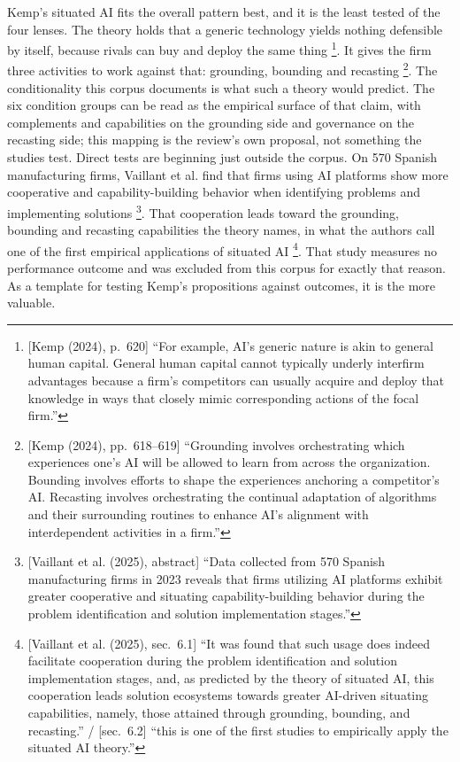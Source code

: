 Kemp's situated AI fits the overall pattern best, and it is the least tested of the
four lenses. The theory holds that a generic technology yields nothing defensible by
itself, because rivals can buy and deploy the same
thing \parencite[p.~620]{kemp2024competitive}\footnote{[Kemp (2024), p.~620] ``For
example, AI's generic nature is akin to general human capital. General human capital
cannot typically underly interfirm advantages because a firm's competitors can usually
acquire and deploy that knowledge in ways that closely mimic corresponding actions of
the focal firm.''}. It gives the firm three activities to work against that:
grounding, bounding and
recasting \parencite[pp.~618--619]{kemp2024competitive}\footnote{[Kemp (2024),
pp.~618--619] ``Grounding involves orchestrating which experiences one's AI will be
allowed to learn from across the organization. Bounding involves efforts to shape the
experiences anchoring a competitor's AI. Recasting involves orchestrating the continual
adaptation of algorithms and their surrounding routines to enhance AI's alignment with
interdependent activities in a firm.''}. The conditionality this corpus documents is
what such a theory would predict. The six condition groups can be read as the
empirical surface of that claim, with complements and capabilities on the grounding
side and governance on the recasting side; this mapping is the review's own proposal,
not something the studies test. Direct tests are beginning just outside the corpus.
On 570 Spanish manufacturing firms, Vaillant et al. find that firms using AI platforms
show more cooperative and capability-building behavior when identifying problems and
implementing solutions \parencite[abstract]{vaillant2025platforms}\footnote{[Vaillant et al. (2025),
abstract] ``Data collected from 570 Spanish manufacturing firms in 2023 reveals that
firms utilizing AI platforms exhibit greater cooperative and situating
capability-building behavior during the problem identification and solution
implementation stages.''}. That cooperation leads toward the grounding, bounding and
recasting capabilities the theory names, in what the authors call one of the first
empirical applications of situated
AI \parencite[secs.~6.1, 6.2]{vaillant2025platforms}\footnote{[Vaillant et al. (2025),
sec.~6.1] ``It was found that such usage does indeed facilitate cooperation during the
problem identification and solution implementation stages, and, as predicted by the
theory of situated AI, this cooperation leads solution ecosystems towards greater
AI-driven situating capabilities, namely, those attained through grounding, bounding,
and recasting.'' / [sec.~6.2] ``this is one of the first studies to empirically apply
the situated AI theory.''}. That study measures no performance outcome and was
excluded from this corpus for exactly that reason. As a template for testing Kemp's
propositions against outcomes, it is the more valuable.

